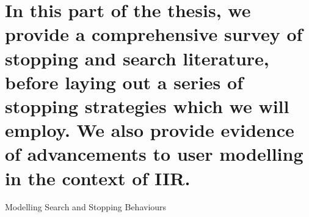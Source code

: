 
\part[Stopping and IIR Modelling]{In this part of the thesis, we provide a comprehensive survey of stopping and search literature, before laying out a series of stopping strategies which we will employ. We also provide evidence of advancements to user modelling in the context of IIR.}{Modelling Search and Stopping Behaviours}\label{part:stopping}